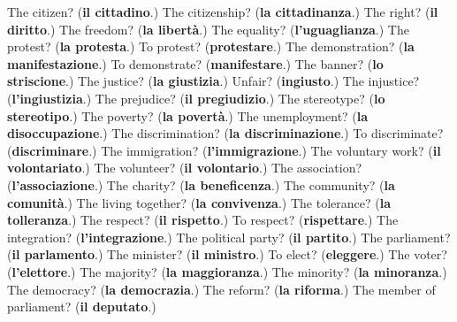 \begin{tcolorbox}[breakable,colback=teal!4,colframe=teal!35!black,title={Before you move on}]
The citizen? (\textbf{il cittadino}.) The citizenship? (\textbf{la cittadinanza}.) The right? (\textbf{il diritto}.) The freedom? (\textbf{la libertà}.) The equality? (\textbf{l'uguaglianza}.) The protest? (\textbf{la protesta}.) To protest? (\textbf{protestare}.) The demonstration? (\textbf{la manifestazione}.) To demonstrate? (\textbf{manifestare}.) The banner? (\textbf{lo striscione}.) The justice? (\textbf{la giustizia}.) Unfair? (\textbf{ingiusto}.) The injustice? (\textbf{l'ingiustizia}.) The prejudice? (\textbf{il pregiudizio}.) The stereotype? (\textbf{lo stereotipo}.) The poverty? (\textbf{la povertà}.) The unemployment? (\textbf{la disoccupazione}.) The discrimination? (\textbf{la discriminazione}.) To discriminate? (\textbf{discriminare}.) The immigration? (\textbf{l'immigrazione}.) The voluntary work? (\textbf{il volontariato}.) The volunteer? (\textbf{il volontario}.) The association? (\textbf{l'associazione}.) The charity? (\textbf{la beneficenza}.) The community? (\textbf{la comunità}.) The living together? (\textbf{la convivenza}.) The tolerance? (\textbf{la tolleranza}.) The respect? (\textbf{il rispetto}.) To respect? (\textbf{rispettare}.) The integration? (\textbf{l'integrazione}.) The political party? (\textbf{il partito}.) The parliament? (\textbf{il parlamento}.) The minister? (\textbf{il ministro}.) To elect? (\textbf{eleggere}.) The voter? (\textbf{l'elettore}.) The majority? (\textbf{la maggioranza}.) The minority? (\textbf{la minoranza}.) The democracy? (\textbf{la democrazia}.) The reform? (\textbf{la riforma}.) The member of parliament? (\textbf{il deputato}.)
\end{tcolorbox}
